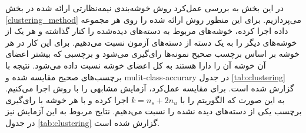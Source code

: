 در این بخش به بررسی عمل‌کرد روش خوشه‌بندی نیمه‌نظارتی ارائه شده در بخش \ref{clustering_method} می‌پردازیم. برای این منظور روش ارائه شده را روی هر مجموعه داده اجرا کرده، خوشه‌های مربوط به دسته‌های دیده‌شده را کنار گذاشته  و هر یک از خوشه‌های دیگر را به یک دسته از دسته‌های آزمون نسبت می‌دهیم. برای این کار در هر خوشه بر اساس برچسب صحیح نمونه‌ها رای‌گیری می‌شود و برچسبی که بیشتر اعضای آن خوشه آن را دارا هستند به کل اعضای خوشه نسبت داده می‌شود. نتیجه با برچسب‌های صحیح مقایسه شده و \gls{mulit-class-accurary} در جدول \ref{tab:clustering} گزارش شده است.
 برای مقایسه عمل‌کرد، آزمایش مشابهی را با روش  اجرا می‌کنیم. به این صورت که  الگوریتم  را با $k=n_s + 2n_u$ اجرا کرده و با هر خوشه با رای‌گیری برچسب یکی از دسته‌های دیده نشده را نسبت می‌دهیم. نتایج مربوط به این آزمایش نیز در جدول \ref{tab:clustering} گزارش شده است.

